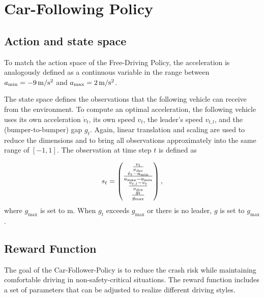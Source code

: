 \documentclass[review]{elsarticle}
\providecommand{\martinc}[1]{}                  %
\providecommand{\sub}[1]{_{\mathrm{#1}}}  %
\providecommand{\3}{{\ss}}
\begin{document}
	
	\section{Car-Following Policy}
	\label{sec:CarFollowingPolicy}
	\subsection{Action and state space}
	\label{stateSpaceFollow}
	To match the action space of the Free-Driving Policy, the acceleration is analogously defined as a continuous variable in the range between $a\sub{\rm min} = \unit[-9]{m/s^2}$ and 
	$a\sub{\rm max} =\unit[2]{m/s^2}$.
	
	
	The state space defines the observations that the following
	vehicle can receive from the environment. To compute an optimal
	acceleration, the following vehicle uses its own acceleration $\dot{v}_t$,
	its own speed $v_t$, the leader's speed $v_{t,l}$,
	and the (bumper-to-bumper) gap $g_t$.
	Again, linear translation and scaling are used
	to reduce the dimensions and to bring all observations approximately
	into the same range of $[-1,1]$. The observation at time step $t$ is defined as
	
	\begin{equation}
	\label{eq:stateFollow}
	s_t = 
	\begin{pmatrix} 
	\frac{v_t}{v\sub{des}} \\ 
	\frac{\dot{v}_t-a\sub{\rm min}}{a\sub{\rm max} - a\sub{\rm min}}\\
	\frac{v_{t,l}-v_t}{v\sub{des}}\\
	\frac{g_t}{g\sub{\rm max}}
	
	\end{pmatrix},
	\end{equation}
	where $g\sub{max}$ is set to  \unit[200]{m}. When $g_t$ exceeds  $g\sub{max}$ or there is no leader, $g$ is set to  $g\sub{max}$.
	
	\subsection{Reward Function}
	\label{rewardFunctionFollow}
	\martinc{Die reward function ist nicht als Funktion des skalierten
		Statevektors S $s_t$, sondern mit Hilfe der unskalierten Statevariablen
		formuliert (obwohl die meisten Terme der Rewardfunktion ihre eigene
		Skalierung enthalten, nicht aber $r_{t,1}$). Stimmt das? Falls nicht, h\"atte man das Problem, dass
		in Extremf\"allen (Tempo 130 oder 150 auf stehendes Hindernis)
		$g\sub{max}=\unit[200]{m}$ nicht ausreicht. Ignoriert die reward
		function die skalierten States (warum braucht man die dann aber?),
		gibt es hingegen kein Problem.}
	The goal of the Car-Follower-Policy is to reduce the crash risk while
	maintaining comfortable driving in non-safety-critical situations. The
	reward function includes a set of parameters that can be
	adjusted to realize different driving styles. 
	
\end{document}

